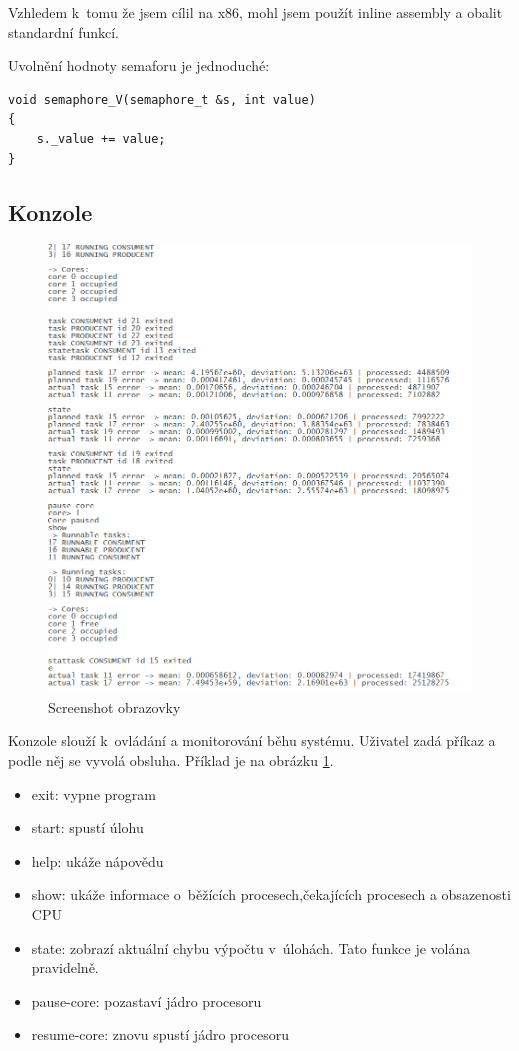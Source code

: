 \documentclass[a4paper,12pt]{article}
\begin{document}
\lstset{language=C++}

Vzhledem k~tomu že jsem cílil na x86, mohl jsem použít inline assembly
a obalit standardní funkcí.

Uvolnění hodnoty semaforu je jednoduché:

\begin{lstlisting}
void semaphore_V(semaphore_t &s, int value)
{
	s._value += value;
}
\end{lstlisting}

\subsection{Konzole}

\begin{figure}
\centering
\includegraphics[width=\textwidth]{obrazky/screen.png}
\caption{Screenshot obrazovky}
\label{fig:screen}
\end{figure}

Konzole slouží k~ovládání a monitorování běhu systému. Uživatel zadá příkaz a podle něj se vyvolá obsluha.
Příklad je na obrázku \ref{fig:screen}.

\begin{itemize}
\item exit: vypne program
\item start: spustí úlohu
\item help: ukáže nápovědu
\item show: ukáže informace o~běžících procesech,čekajících procesech a obsazenosti CPU
\item state: zobrazí aktuální chybu výpočtu v~úlohách. Tato funkce je volána pravidelně.
\item pause-core: pozastaví jádro procesoru
\item resume-core: znovu spustí jádro procesoru
\end{itemize}
\end{document}
